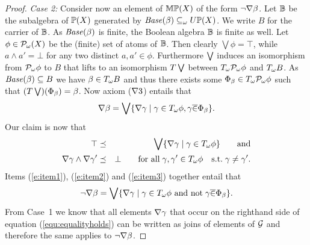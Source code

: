\documentclass{book}
\begin{document}
\begin{proof}
{\em Case 2:} Consider now an element of $\mathbb{M} \mathbb{P}(X)$ of the form
$\neg \nabla \beta$. Let
$\mathbb{B}$ be the subalgebra of $\mathbb{P}(X)$ 
generated by $\mathit{Base}(\beta) \subseteq_\omega U \mathbb{P}(X)$.
We write $B$ for the carrier of $\mathbb{B}$. 
As $\mathit{Base}(\beta)$ is finite, the Boolean algebra 
$\mathbb{B}$ is finite as well. 
Let $\phi \in \mathcal{P}_{\omega} (X)$ be the
(finite) set of atoms of $\mathbb{B}$.
Then clearly $\bigvee \phi = \top$, while $a \wedge a' = \bot$ for any two
distinct $a,a' \in \phi$.
Furthermore $\bigvee$ induces an isomorphism from
$\mathcal{P}_{\omega} \phi$ to $B$ that lifts to
an isomorphism $T \bigvee$ between $T_{\omega} \mathcal{P}_{\omega} \phi$
and $T_{\omega} B$. As $\mathit{Base}(\beta)\subseteq B$ we have   
$\beta \in T_{\omega} B$ and thus there exists some
$\Phi_\beta \in T_{\omega} \mathcal{P}_{\omega} \phi$ such that
$(T \bigvee)(\Phi_\beta) = \beta$. 
Now axiom ($\nabla 3$) entails that
\begin{equation}\label{e:item1}
   \nabla \beta = \bigvee \{ \nabla \gamma \mid \gamma \in T_{\omega}\phi,
   \gamma \overline{\in} \Phi_\beta \}.
\end{equation}
Our claim is now that 
\begin{eqnarray}
   \top & \preceq & \bigvee \{ \nabla\gamma \mid \gamma \in T_{\omega}\phi\} \qquad \mbox{and} \label{e:item2} \\
   \nabla \gamma \wedge \nabla \gamma' & \preceq & \bot \qquad \mbox{for all} \; \gamma,\gamma' \in T_{\omega} \phi
   \quad \mbox{s.t.} \; \gamma \not= \gamma'. \label{e:item3}
\end{eqnarray}
Items (\ref{e:item1}), (\ref{e:item2}) and (\ref{e:item3}) 
together entail that 
\begin{equation}\label{equ:equalityholds}
\neg \nabla \beta = \bigvee \{ \nabla \gamma \mid 
\gamma \in T_{\omega} \phi \mbox{\ and not} \; \gamma \overline{\in} \Phi_\beta \}.
\end{equation}
From Case~1 we know that all elements $\nabla \gamma$ that occur on the righthand side 
of equation (\ref{equ:equalityholds}) can be written as joins of
elements of $\mathcal{G}$ and therefore the same applies to $\neg\nabla\beta$.


\end{proof}
\end{document}
